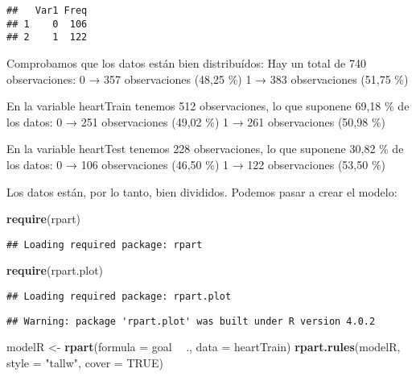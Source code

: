 \documentclass[
]{article}
\newenvironment{Shaded}{\begin{snugshade}}{\end{snugshade}}
\newcommand{\DataTypeTok}[1]{\textcolor[rgb]{0.13,0.29,0.53}{#1}}
\newcommand{\KeywordTok}[1]{\textcolor[rgb]{0.13,0.29,0.53}{\textbf{#1}}}
\newcommand{\NormalTok}[1]{#1}
\newcommand{\OperatorTok}[1]{\textcolor[rgb]{0.81,0.36,0.00}{\textbf{#1}}}
\newcommand{\OtherTok}[1]{\textcolor[rgb]{0.56,0.35,0.01}{#1}}
\newcommand{\StringTok}[1]{\textcolor[rgb]{0.31,0.60,0.02}{#1}}
\begin{document}
\begin{Shaded}
\end{Shaded}

\begin{verbatim}
##   Var1 Freq
## 1    0  106
## 2    1  122
\end{verbatim}

Comprobamos que los datos están bien distribuídos: Hay un total de 740
observaciones: 0 → 357 observaciones (48,25 \%) 1 → 383 observaciones
(51,75 \%)

En la variable heartTrain tenemos 512 observaciones, lo que suponene
69,18 \% de los datos: 0 → 251 observaciones (49,02 \%) 1 → 261
observaciones (50,98 \%)

En la variable heartTest tenemos 228 observaciones, lo que suponene
30,82 \% de los datos: 0 → 106 observaciones (46,50 \%) 1 → 122
observaciones (53,50 \%)

Los datos están, por lo tanto, bien divididos. Podemos pasar a crear el
modelo:

\begin{Shaded}
\begin{Highlighting}[]
\KeywordTok{require}\NormalTok{(rpart)}
\end{Highlighting}
\end{Shaded}

\begin{verbatim}
## Loading required package: rpart
\end{verbatim}

\begin{Shaded}
\begin{Highlighting}[]
\KeywordTok{require}\NormalTok{(rpart.plot)}
\end{Highlighting}
\end{Shaded}

\begin{verbatim}
## Loading required package: rpart.plot
\end{verbatim}

\begin{verbatim}
## Warning: package 'rpart.plot' was built under R version 4.0.2
\end{verbatim}

\begin{Shaded}
\begin{Highlighting}[]
\NormalTok{modelR <-}\StringTok{ }\KeywordTok{rpart}\NormalTok{(}\DataTypeTok{formula =}\NormalTok{ goal }\OperatorTok{~}\StringTok{ }\NormalTok{., }\DataTypeTok{data =}\NormalTok{ heartTrain)}
\KeywordTok{rpart.rules}\NormalTok{(modelR, }\DataTypeTok{style =} \StringTok{"tallw"}\NormalTok{, }\DataTypeTok{cover =} \OtherTok{TRUE}\NormalTok{)}
\end{Highlighting}
\end{Shaded}
\end{document}
